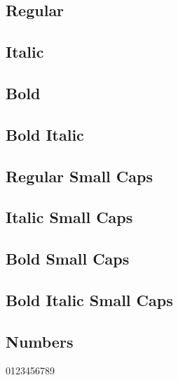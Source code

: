 \documentclass{article}
\begin{document}
\subsection*{Regular}
\lipsum[1]

\subsection*{Italic}
\textit{\lipsum[2]}

\subsection*{Bold}
\textbf{\lipsum[3]}

\subsection*{Bold Italic}

\textbf{\textit{\lipsum[4]}}

\subsection*{Regular Small Caps}
\textsc{\lipsum[1]}

\subsection*{Italic Small Caps}
\textsc{\textit{\lipsum[2]}}


\subsection*{Bold Small Caps}
\textsc{\textbf{\lipsum[3]}}

\subsection*{Bold Italic Small Caps}

\textsc{\textbf{\textit{\lipsum[4]}}}

\subsection*{Numbers}

0123456789
\end{document}
